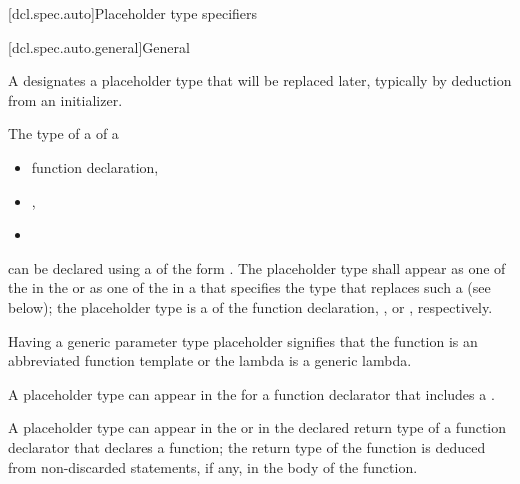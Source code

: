 [dcl.spec.auto]{Placeholder type specifiers}%

[dcl.spec.auto.general]{General}%
%

\begin{bnf}
\br
   \br
    \terminal{(}  \terminal{)}
\end{bnf}

\pnum
A 
designates a placeholder type that will be replaced later,
typically by deduction
from an initializer.

\pnum
The type of a  of a
\begin{itemize}
  \item function declaration,
  \item {},
  \item {}
\end{itemize}
can be declared using
a  of the form
 .
The placeholder type shall appear
as one of the  in
the  or
as one of the  in
a 
that specifies the type that replaces such
a  (see below);
the placeholder type
is a 
of the
function declaration,
, or
, respectively.
\begin{note}
Having a generic parameter type placeholder
signifies that the function is
an abbreviated function template or
the lambda is a generic lambda.
\end{note}

\pnum
A placeholder type can appear in
the  for a function declarator
that includes a .

\pnum
A placeholder type can appear in
the  or 
in the declared return type of a function declarator that declares a function;
the return type of the function is
deduced from non-discarded  statements, if any, in the body
of the function.

